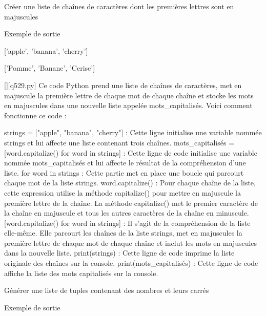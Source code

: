        \question
        Créer une liste de chaînes de caractères dont les premières lettres sont en majuscules

Exemple de sortie

['apple', 'banana', 'cherry']

['Pomme', 'Banane', 'Cerise']
        \par
        \begin{solution}
            \renewcommand{\nomfichier}{q529.py}
            \pythonfile{\chemincode \nomfichier}[][\nomfichier]
            Ce code Python prend une liste de chaînes de caractères, met en majuscule la première lettre de chaque mot de chaque chaîne et stocke les mots en majuscules dans une nouvelle liste appelée mots_capitalisés. Voici comment fonctionne ce code :

    strings = ["apple", "banana", "cherry"] : Cette ligne initialise une variable nommée strings et lui affecte une liste contenant trois chaînes.
    mots_capitalisés = [word.capitalize() for word in strings] : Cette ligne de code initialise une variable nommée mots_capitalisés et lui affecte le résultat de la compréhension d'une liste.
        for word in strings : Cette partie met en place une boucle qui parcourt chaque mot de la liste strings.
        word.capitalize() : Pour chaque chaîne de la liste, cette expression utilise la méthode capitalize() pour mettre en majuscule la première lettre de la chaîne. La méthode capitalize() met le premier caractère de la chaîne en majuscule et tous les autres caractères de la chaîne en minuscule.
        [word.capitalize() for word in strings] : Il s'agit de la compréhension de la liste elle-même. Elle parcourt les chaînes de la liste strings, met en majuscules la première lettre de chaque mot de chaque chaîne et inclut les mots en majuscules dans la nouvelle liste.
    print(strings) : Cette ligne de code imprime la liste originale des chaînes sur la console.
    print(mots_capitalisés) : Cette ligne de code affiche la liste des mots capitalisés sur la console.
        \end{solution}
        

        \question
        Générer une liste de tuples contenant des nombres et leurs carrés

Exemple de sortie

